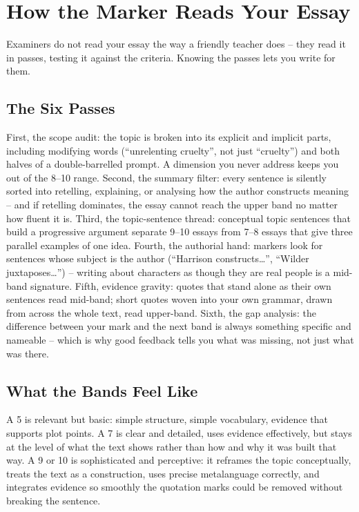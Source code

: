 \documentclass[a4paper]{article}
\begin{document}
\clearpage
\thispagestyle{empty}
\hfill
\clearpage
\cleardoublepage

\section{How the Marker Reads Your Essay}

Examiners do not read your essay the way a friendly teacher does -- they read it in passes, testing it against the criteria. Knowing the passes lets you write for them.\\

\subsection{The Six Passes}
First, the scope audit: the topic is broken into its explicit and implicit parts, including modifying words (``unrelenting cruelty'', not just ``cruelty'') and both halves of a double-barrelled prompt. A dimension you never address keeps you out of the 8--10 range. Second, the summary filter: every sentence is silently sorted into retelling, explaining, or analysing how the author constructs meaning -- and if retelling dominates, the essay cannot reach the upper band no matter how fluent it is. Third, the topic-sentence thread: conceptual topic sentences that build a progressive argument separate 9--10 essays from 7--8 essays that give three parallel examples of one idea. Fourth, the authorial hand: markers look for sentences whose subject is the author (``Harrison constructs\ldots'', ``Wilder juxtaposes\ldots'') -- writing about characters as though they are real people is a mid-band signature. Fifth, evidence gravity: quotes that stand alone as their own sentences read mid-band; short quotes woven into your own grammar, drawn from across the whole text, read upper-band. Sixth, the gap analysis: the difference between your mark and the next band is always something specific and nameable -- which is why good feedback tells you what was missing, not just what was there.\\

\subsection{What the Bands Feel Like}
A 5 is relevant but basic: simple structure, simple vocabulary, evidence that supports plot points. A 7 is clear and detailed, uses evidence effectively, but stays at the level of what the text shows rather than how and why it was built that way. A 9 or 10 is sophisticated and perceptive: it reframes the topic conceptually, treats the text as a construction, uses precise metalanguage correctly, and integrates evidence so smoothly the quotation marks could be removed without breaking the sentence.\\
\end{document}

